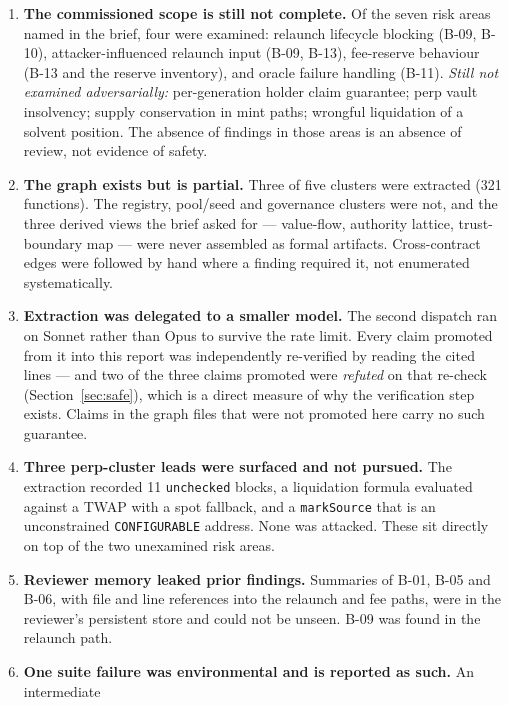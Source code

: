 \documentclass[11pt,a4paper]{article}
\newcommand{\code}[1]{\texttt{\small #1}}
\begin{document}
\begin{enumerate}
\item \textbf{The commissioned scope is still not complete.} Of the seven risk areas named
      in the brief, four were examined: relaunch lifecycle blocking (B-09, B-10),
      attacker-influenced relaunch input (B-09, B-13), fee-reserve behaviour (B-13 and the
      reserve inventory), and oracle failure handling (B-11). \emph{Still not examined
      adversarially:} per-generation holder claim guarantee; perp vault insolvency;
      supply conservation in mint paths; wrongful liquidation of a solvent position. The
      absence of findings in those areas is an absence of review, not evidence of safety.
\item \textbf{The graph exists but is partial.} Three of five clusters were extracted (321
      functions). The registry, pool/seed and governance clusters were not, and the three
      derived views the brief asked for --- value-flow, authority lattice, trust-boundary
      map --- were never assembled as formal artifacts. Cross-contract edges were followed
      by hand where a finding required it, not enumerated systematically.
\item \textbf{Extraction was delegated to a smaller model.} The second dispatch ran on
      Sonnet rather than Opus to survive the rate limit. Every claim promoted from it into
      this report was independently re-verified by reading the cited lines --- and two of
      the three claims promoted were \emph{refuted} on that re-check
      (Section~\ref{sec:safe}), which is a direct measure of why the verification step
      exists. Claims in the graph files that were not promoted here carry no such
      guarantee.
\item \textbf{Three perp-cluster leads were surfaced and not pursued.} The extraction
      recorded 11 \code{unchecked} blocks, a liquidation formula evaluated against a TWAP
      with a spot fallback, and a \code{markSource} that is an unconstrained
      \code{CONFIGURABLE} address. None was attacked. These sit directly on top of the two
      unexamined risk areas.
\item \textbf{Reviewer memory leaked prior findings.} Summaries of B-01, B-05 and B-06,
      with file and line references into the relaunch and fee paths, were in the reviewer's
      persistent store and could not be unseen. B-09 was found in the relaunch path.
\item \textbf{One suite failure was environmental and is reported as such.} An intermediate

\end{enumerate}
\end{document}
